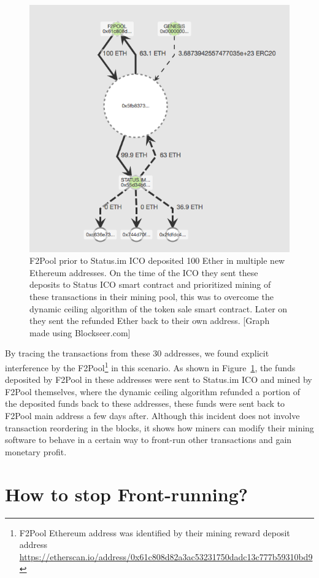 \begin{figure}[t]
\centering
\includegraphics[width=0.7\linewidth]{figures/F2Pool_transactions_to_StatusICO_and_Refunds.png}
\caption{\scriptsize F2Pool prior to Status.im ICO deposited 100 Ether in multiple new Ethereum addresses. On the time of the ICO they sent these deposits to Status ICO smart contract and prioritized mining of these transactions in their mining pool, this was to overcome the dynamic ceiling algorithm of the token sale smart contract. Later on they sent the refunded Ether back to their own address. [Graph made using Blockseer.com] \label{fig:f2poolfront-run}}
\end{figure}

By tracing the transactions from these 30 addresses, we found explicit interference by the F2Pool\footnote{F2Pool Ethereum address was identified by their mining reward deposit address \url{https://etherscan.io/address/0x61c808d82a3ac53231750dadc13c777b59310bd9}} in this scenario. As shown in Figure~\ref{fig:f2poolfront-run}, the funds deposited by F2Pool in these addresses were sent to Status.im ICO and mined by F2Pool themselves, where the dynamic ceiling algorithm refunded a portion of the deposited funds back to these addresses, these funds were sent back to F2Pool main address a few days after. Although this incident does not involve transaction reordering in the blocks, it shows how miners can modify their mining software to behave in a certain way to front-run other transactions and gain monetary profit.




\section{How to stop Front-running?} %


